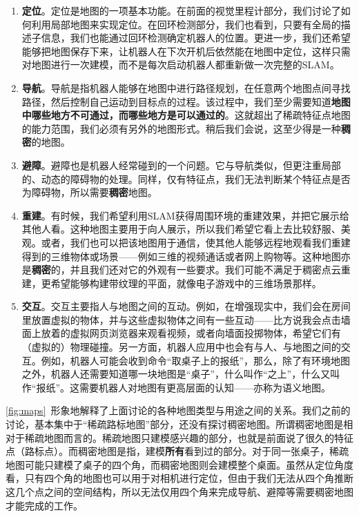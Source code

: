 \begin{enumerate}
	\item \textbf{定位}。定位是地图的一项基本功能。在前面的视觉里程计部分，我们讨论了如何利用局部地图来实现定位。在回环检测部分，我们也看到，只要有全局的描述子信息，我们也能通过回环检测确定机器人的位置。更进一步，我们还希望能够把地图保存下来，让机器人在下次开机后依然能在地图中定位，这样只需对地图进行一次建模，而不是每次启动机器人都重新做一次完整的SLAM。
	\item \textbf{导航}。导航是指机器人能够在地图中进行路径规划，在任意两个地图点间寻找路径，然后控制自己运动到目标点的过程。该过程中，我们至少需要知道\textbf{地图中哪些地方不可通过，而哪些地方是可以通过的}。这就超出了稀疏特征点地图的能力范围，我们必须有另外的地图形式。稍后我们会说，这至少得是一种\textbf{稠密}的地图。
	\item \textbf{避障}。避障也是机器人经常碰到的一个问题。它与导航类似，但更注重局部的、动态的障碍物的处理。同样，仅有特征点，我们无法判断某个特征点是否为障碍物，所以需要\textbf{稠密}地图。
	\item \textbf{重建}。有时候，我们希望利用SLAM获得周围环境的重建效果，并把它展示给其他人看。这种地图主要用于向人展示，所以我们希望它看上去比较舒服、美观。或者，我们也可以把该地图用于通信，使其他人能够远程地观看我们重建得到的三维物体或场景——例如三维的视频通话或者网上购物等。这种地图亦是\textbf{稠密}的，并且我们还对它的外观有一些要求。我们可能不满足于稠密点云重建，更希望能够构建带纹理的平面，就像电子游戏中的三维场景那样。
	\item \textbf{交互}。交互主要指人与地图之间的互动。例如，在增强现实中，我们会在房间里放置虚拟的物体，并与这些虚拟物体之间有一些互动——比方说我会点击墙面上放着的虚拟网页浏览器来观看视频，或者向墙面投掷物体，希望它们有（虚拟的）物理碰撞。另一方面，机器人应用中也会有与人、与地图之间的交互。例如，机器人可能会收到命令“取桌子上的报纸”，那么，除了有环境地图之外，机器人还需要知道哪一块地图是“桌子”，什么叫作“之上”，什么又叫作“报纸”。这需要机器人对地图有更高层面的认知——亦称为语义地图。
\end{enumerate}

\autoref{fig:maps}~形象地解释了上面讨论的各种地图类型与用途之间的关系。我们之前的讨论，基本集中于“稀疏路标地图”部分，还没有探讨稠密地图。所谓稠密地图是相对于稀疏地图而言的。稀疏地图只建模感兴趣的部分，也就是前面说了很久的特征点（路标点）。而稠密地图是指，建模\textbf{所有}看到过的部分。对于同一张桌子，稀疏地图可能只建模了桌子的四个角，而稠密地图则会建模整个桌面。虽然从定位角度看，只有四个角的地图也可以用于对相机进行定位，但由于我们无法从四个角推断这几个点之间的空间结构，所以无法仅用四个角来完成导航、避障等需要稠密地图才能完成的工作。

